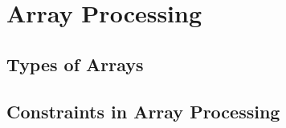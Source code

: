 \chapter{Array Processing} 
     \section{Types of Arrays}
     
     \section{Constraints in Array Processing}
